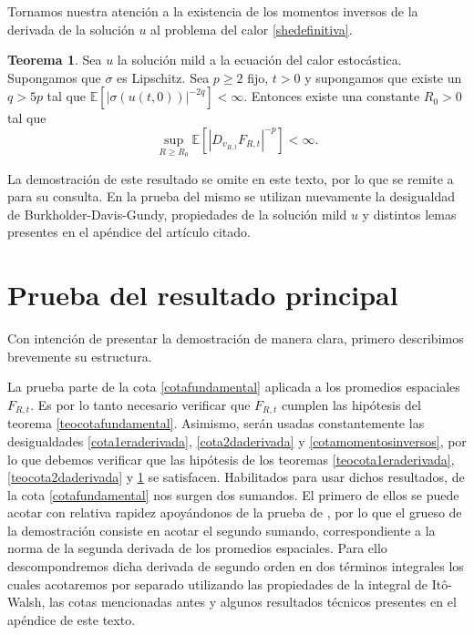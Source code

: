 \documentclass[letterpaper,twoside,12pt]{book}
\newcommand{\E}{\mathbb{E}}
\newcommand{\1}{\mathds{1}}
\newcommand{\abs}[1]{\left\lvert #1 \right\rvert}
\theoremstyle{definition}
\theoremstyle{definition}
\newtheorem{teo}{Teorema}
\theoremstyle{remark}
\theoremstyle{definition}
\theoremstyle{definition}
\theoremstyle{definition}
\theoremstyle{definition}
\theoremstyle{definition}
\begin{document}
   Tornamos nuestra atención a la existencia de los momentos inversos de la derivada de la solución $u$ al problema del calor \eqref{shedefinitiva}.
\begin{teo}\label{teocotamomentosinversos}
   Sea $u$ la solución mild a la ecuación del calor estocástica. Supongamos que $\sigma$ es Lipschitz. Sea $p\geq2$ fijo, $t>0$ y supongamos que existe un $q>5p$ tal que $\E\left[\abs{\sigma(u(t,0))}^{-2q}\right]<\infty$. Entonces existe una constante $R_0>0$ tal que 
   \begin{equation}\label{cotamomentosinversos}
      \sup_{R\geq R_0}\E\left[\abs{D_{v_{R,t}}F_{R,t}}^{-p}\right]<\infty.
   \end{equation}
   
   \end{teo}
   La demostración de este resultado se omite en este texto, por lo que se remite a \cite[proposición 4.2]{KUZGUN202268} para su consulta. En la prueba del mismo se utilizan nuevamente la desigualdad de Burkholder-Davis-Gundy, propiedades de la solución mild $u$ y distintos lemas presentes en el apéndice del artículo citado.

\section{Prueba del resultado principal}
Con intención de presentar la demostración de manera clara, primero describimos brevemente su estructura.

La prueba parte de la cota \eqref{cotafundamental} aplicada a los promedios espaciales $F_{R,t}$. Es por lo tanto necesario verificar que $F_{R,t}$ cumplen las hipótesis del teorema \ref{teocotafundamental}. Asimismo, serán usadas constantemente las desigualdades \eqref{cota1eraderivada}, \eqref{cota2daderivada} y \eqref{cotamomentosinversos}, por lo que debemos verificar que las hipótesis de los teoremas \ref{teocota1eraderivada}, \ref{teocota2daderivada} y \ref{teocotamomentosinversos} se satisfacen. Habilitados para usar dichos resultados, de la cota \eqref{cotafundamental} nos surgen dos sumandos. El primero de ellos se puede acotar con relativa rapidez apoyándonos de la prueba de \cite[teorema 1.1]{HUANG20207170}, por lo que el grueso de la demostración consiste en acotar el segundo sumando, correspondiente a la norma de la segunda derivada de los promedios espaciales. Para ello descompondremos dicha derivada de segundo orden en dos términos integrales los cuales acotaremos por separado utilizando las propiedades de la integral de Itô-Walsh, las cotas mencionadas antes y algunos resultados técnicos presentes en el apéndice de este texto.
\end{document}
